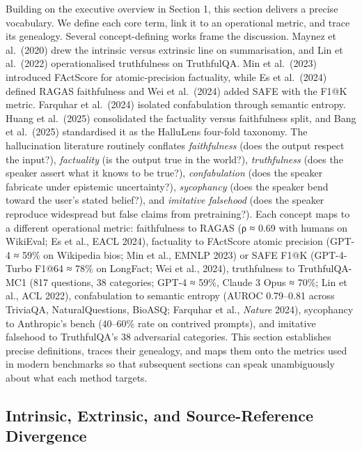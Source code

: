 Building on the executive overview in Section 1, this section delivers a precise vocabulary. We define each core term, link it to an operational metric, and trace its genealogy. Several concept-defining works frame the discussion. Maynez et al.~(2020) drew the intrinsic versus extrinsic line on summarisation, and Lin et al.~(2022) operationalised truthfulness on TruthfulQA. Min et al.~(2023) introduced FActScore for atomic-precision factuality, while Es et al.~(2024) defined RAGAS faithfulness and Wei et al.~(2024) added SAFE with the F1@K metric. Farquhar et al.~(2024) isolated confabulation through semantic entropy. Huang et al.~(2025) consolidated the factuality versus faithfulness split, and Bang et al.~(2025) standardised it as the HalluLens four-fold taxonomy. The hallucination literature routinely conflates \emph{faithfulness} (does the output respect the input?), \emph{factuality} (is the output true in the world?), \emph{truthfulness} (does the speaker assert what it knows to be true?), \emph{confabulation} (does the speaker fabricate under epistemic uncertainty?), \emph{sycophancy} (does the speaker bend toward the user's stated belief?), and \emph{imitative falsehood} (does the speaker reproduce widespread but false claims from pretraining?). Each concept maps to a different operational metric: faithfulness to RAGAS (ρ ≈ 0.69 with humans on WikiEval; Es et al., EACL 2024), factuality to FActScore atomic precision (GPT-4 ≈ 59\% on Wikipedia bios; Min et al., EMNLP 2023) or SAFE F1@K (GPT-4-Turbo F1@64 ≈ 78\% on LongFact; Wei et al., 2024), truthfulness to TruthfulQA-MC1 (817 questions, 38 categories; GPT-4 ≈ 59\%, Claude 3 Opus ≈ 70\%; Lin et al., ACL 2022), confabulation to semantic entropy (AUROC 0.79--0.81 across TriviaQA, NaturalQuestions, BioASQ; Farquhar et al., \emph{Nature} 2024), sycophancy to Anthropic's bench (40--60\% rate on contrived prompts), and imitative falsehood to TruthfulQA's 38 adversarial categories. This section establishes precise definitions, traces their genealogy, and maps them onto the metrics used in modern benchmarks so that subsequent sections can speak unambiguously about what each method targets.

\subsection{Intrinsic, Extrinsic, and Source-Reference Divergence}\label{intrinsic-extrinsic-and-source-reference-divergence}

